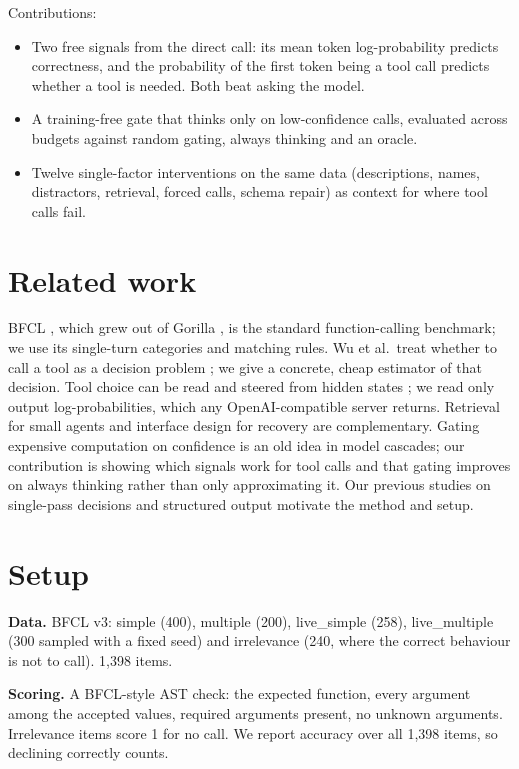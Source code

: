 \documentclass[10pt,twocolumn]{article}
\begin{document}
Contributions:
\begin{itemize}
\item Two free signals from the direct call: its mean token log-probability predicts correctness, and the probability
of the first token being a tool call predicts whether a tool is needed. Both beat asking the model.
\item A training-free gate that thinks only on low-confidence calls, evaluated across budgets against random gating,
always thinking and an oracle.
\item Twelve single-factor interventions on the same data (descriptions, names, distractors, retrieval, forced
calls, schema repair) as context for where tool calls fail.
\end{itemize}

\section{Related work}

BFCL \cite{bfcl}, which grew out of Gorilla \cite{gorilla}, is the standard function-calling benchmark; we use its
single-turn categories and matching rules. Wu et al.\ treat whether to call a tool as a decision problem
\cite{tocall}; we give a concrete, cheap estimator of that decision. Tool choice can be read and steered from hidden
states \cite{linear}; we read only output log-probabilities, which any OpenAI-compatible server returns. Retrieval for
small agents \cite{dtdr,toolomni} and interface design for recovery \cite{aft} are complementary. Gating expensive
computation on confidence is an old idea in model cascades; our contribution is showing which signals work for tool
calls and that gating improves on always thinking rather than only approximating it. Our previous studies on
single-pass decisions \cite{anydecide} and structured output \cite{schematax} motivate the method and setup.

\section{Setup}

\textbf{Data.} BFCL v3: simple (400), multiple (200), live\_simple (258), live\_multiple (300 sampled with a fixed
seed) and irrelevance (240, where the correct behaviour is not to call). 1,398 items.

\textbf{Scoring.} A BFCL-style AST check: the expected function, every argument among the accepted values, required
arguments present, no unknown arguments. Irrelevance items score 1 for no call. We report accuracy over all 1,398
items, so declining correctly counts.
\end{document}
